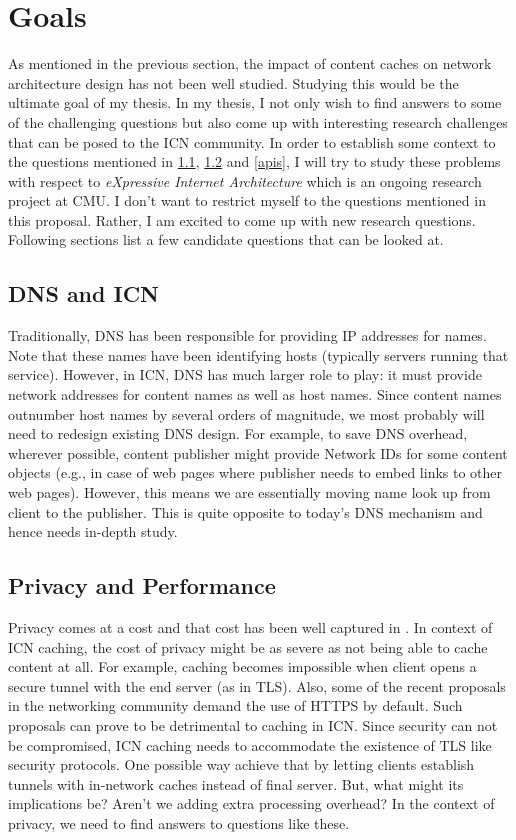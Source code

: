 \section{Goals}
As mentioned in the previous section, the impact of content caches on
network architecture design has not been well studied. Studying this
would be the ultimate goal of my thesis. In my thesis, I not only wish
to find answers to some of the challenging questions but also come up
with interesting research challenges that can be posed to the ICN
community. In order to establish some context to the questions
mentioned in \ref{icn_dns}, \ref{priv} and \ref{apis}, I will try to
study these problems with respect to \emph{eXpressive Internet
  Architecture}\cite{xia} which is an ongoing research project at CMU.
I don't want to restrict myself to the questions mentioned in this
proposal. Rather, I am excited to come up with new research
questions. Following sections list a few candidate questions that can
be looked at.

\subsection{DNS and ICN}
\label{icn_dns}
Traditionally, DNS has been responsible for providing IP addresses for
names. Note that these names have been identifying hosts (typically
servers running that service). However, in ICN, DNS has much larger
role to play: it must provide network addresses for content names as
well as host names. Since content names outnumber host names by
several orders of magnitude, we most probably will need to redesign
existing DNS design. For example, to save DNS overhead, wherever
possible, content publisher might provide Network IDs for some content
objects (e.g., in case of web pages where publisher needs to embed
links to other web pages). However, this means we are essentially
moving name look up from client to the publisher. This is quite
opposite to today's DNS mechanism and hence needs in-depth study.

\subsection{Privacy and Performance}
\label{priv}
Privacy comes at a cost and that cost has been well captured in
\cite{cost_https}. In context of ICN caching, the cost of privacy
might be as severe as not being able to cache content at all. For
example, caching becomes impossible when client opens a secure tunnel
with the end server (as in TLS). Also, some of the recent proposals in
the networking community demand the use of HTTPS by default. Such
proposals can prove to be detrimental to caching in ICN. Since
security can not be compromised, ICN caching needs to accommodate the
existence of TLS like security protocols. One possible way achieve
that by letting clients establish tunnels with in-network caches
instead of final server. But, what might its implications be? Aren't
we adding extra processing overhead? In the context of privacy, we
need to find answers to questions like these.

